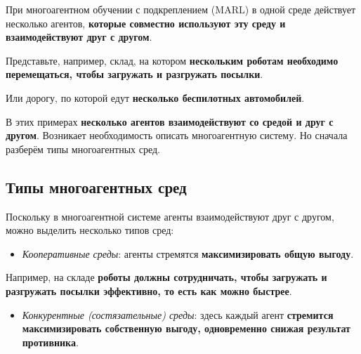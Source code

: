 \documentclass[11pt,a4paper]{article}
\begin{document}
При многоагентном обучении с подкреплением (MARL) в одной среде действует несколько агентов, \textbf{которые совместно используют эту среду и взаимодействуют друг с другом}.

Представьте, например, склад, на котором \textbf{нескольким роботам необходимо перемещаться, чтобы загружать и разгружать посылки}.


Или дорогу, по которой едут \textbf{несколько беспилотных автомобилей}.


В этих примерах \textbf{несколько агентов взаимодействуют со средой и друг с другом}. Возникает необходимость описать многоагентную систему. Но сначала разберём типы многоагентных сред.

\subsection{Типы многоагентных сред}\label{different-types-of-multi-agent-environments}

Поскольку в многоагентной системе агенты взаимодействуют друг с другом, можно выделить несколько типов сред:

\begin{itemize}
\tightlist
\item
  \emph{Кооперативные среды}: агенты стремятся \textbf{максимизировать общую выгоду}.
\end{itemize}

Например, на складе \textbf{роботы должны сотрудничать, чтобы загружать и разгружать посылки эффективно, то есть как можно быстрее}.

\begin{itemize}
\tightlist
\item
  \emph{Конкурентные (состязательные) среды}: здесь каждый агент \textbf{стремится максимизировать собственную выгоду, одновременно снижая результат противника}.
\end{itemize}
\end{document}
